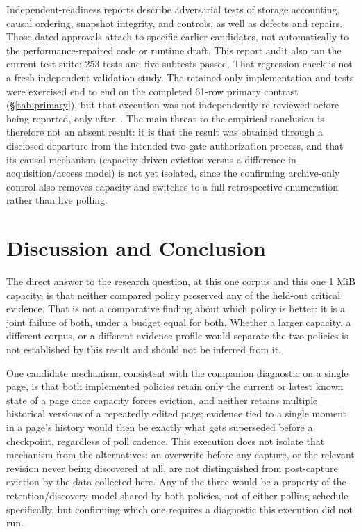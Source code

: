 \documentclass[11pt]{article}
\begin{document}
Independent-readiness reports describe adversarial tests of storage accounting, causal ordering, snapshot integrity, and controls, as well as defects and repairs. Those dated approvals attach to specific earlier candidates, not automatically to the performance-repaired code or runtime draft. This report audit also ran the current test suite: 253 tests and five subtests passed. That regression check is not a fresh independent validation study. The retained-only implementation and tests were exercised end to end on the completed 61-row primary contrast (\S\ref{tab:primary}), but that execution was not independently re-reviewed before being reported, only after~\cite{primaryresult}. The main threat to the empirical conclusion is therefore not an absent result: it is that the result was obtained through a disclosed departure from the intended two-gate authorization process, and that its causal mechanism (capacity-driven eviction versus a difference in acquisition/access model) is not yet isolated, since the confirming archive-only control also removes capacity and switches to a full retrospective enumeration rather than live polling.

\section{Discussion and Conclusion}
The direct answer to the research question, at this one corpus and this one 1 MiB capacity, is that neither compared policy preserved any of the held-out critical evidence. That is not a comparative finding about which policy is better: it is a joint failure of both, under a budget equal for both. Whether a larger capacity, a different corpus, or a different evidence profile would separate the two policies is not established by this result and should not be inferred from it.

One candidate mechanism, consistent with the companion diagnostic on a single page, is that both implemented policies retain only the current or latest known state of a page once capacity forces eviction, and neither retains multiple historical versions of a repeatedly edited page; evidence tied to a single moment in a page's history would then be exactly what gets superseded before a checkpoint, regardless of poll cadence. This execution does not isolate that mechanism from the alternatives: an overwrite before any capture, or the relevant revision never being discovered at all, are not distinguished from post-capture eviction by the data collected here. Any of the three would be a property of the retention/discovery model shared by both policies, not of either polling schedule specifically, but confirming which one requires a diagnostic this execution did not run.
\end{document}
